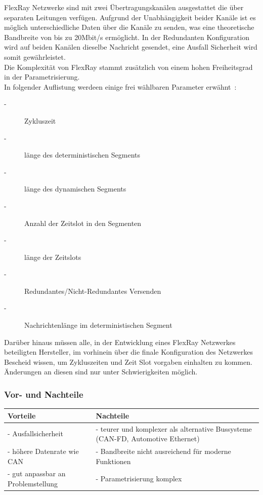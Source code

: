     FlexRay Netzwerke sind mit zwei Übertragungskanälen ausgestattet die über separaten Leitungen 
    verfügen. Aufgrund der Unabhängigkeit beider Kanäle ist es möglich unterschiedliche Daten über
    die Kanäle zu senden, was eine theoretische Bandbreite von bis zu 20Mbit/s ermöglicht. 
    In der Redundanten Konfiguration wird auf beiden Kanälen dieselbe Nachricht gesendet, eine 
    Ausfall Sicherheit wird somit gewährleistet.~\cite{LA_FR3}\\
    
    Die Komplexität von FlexRay stammt zusätzlich von einem hohen Freiheitsgrad in der
    Parametrisierung.\\
    In folgender Auflistung werdeen einige frei wählbaren Parameter erwähnt~\cite{LA_FR2}:
    \begin{description}
    \item[-] Zykluszeit
    \item[-] länge des deterministischen Segments
    \item[-] länge des dynamischen Segments
    \item[-] Anzahl der Zeitslot in den Segmenten
    \item[-] länge der Zeitslots
    \item[-] Redundantes/Nicht-Redundantes Versenden
    \item[-] Nachrichtenlänge im deterministischen Segment
    \end{description}

    Darüber hinaus müssen alle, in der Entwicklung eines FlexRay Netzwerkes beteiligten Hersteller, im 
    vorhinein über die finale Konfiguration des Netzwerkes Bescheid wissen, um Zykluszeiten und 
    Zeit Slot vorgaben einhalten zu kommen. Änderungen an diesen sind nur unter Schwierigkeiten möglich.


    \subsubsection{Vor- und Nachteile}
    \begin{center}
        \begin{tabular}{p{5.5cm} p{5.5cm}}
            \hline
            Vorteile & Nachteile\\
            \hline
            \hline - Ausfallsicherheit & - teurer und komplexer als alternative Bussysteme (CAN-FD, Automotive Ethernet)\\
            \hline - höhere Datenrate wie CAN &  - Bandbreite nicht ausreichend für moderne Funktionen\\
            \hline - gut anpassbar an Problemstellung & - Parametrisierung komplex\\
            \hline
        \end{tabular}            
    \end{center}

